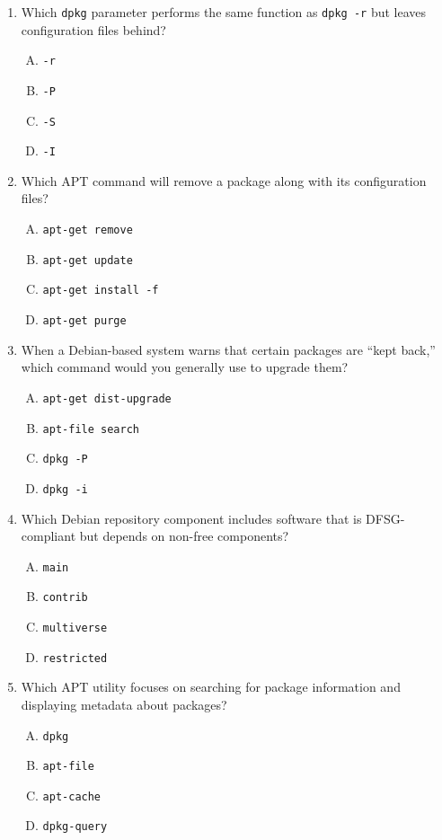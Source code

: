 \documentclass[a4paper]{report}
\begin{document}
\begin{enumerate}[1.]
    \item Which \texttt{dpkg} parameter performs the same function as \texttt{dpkg -r} but leaves configuration files behind?  
    \begin{enumerate}[A)]
        \item \texttt{-r}  
        \item \texttt{-P}  
        \item \texttt{-S}  
        \item \texttt{-I}  
    \end{enumerate}

    \item Which APT command will remove a package along with its configuration files?  
    \begin{enumerate}[A)]
        \item \texttt{apt-get remove}  
        \item \texttt{apt-get update}  
        \item \texttt{apt-get install -f}  
        \item \texttt{apt-get purge}  
    \end{enumerate}

    \item When a Debian-based system warns that certain packages are “kept back,” which command would you generally use to upgrade them?  
    \begin{enumerate}[A)]
        \item \texttt{apt-get dist-upgrade}  
        \item \texttt{apt-file search}  
        \item \texttt{dpkg -P}  
        \item \texttt{dpkg -i}  
    \end{enumerate}

    \item Which Debian repository component includes software that is DFSG-compliant but depends on non-free components?  
    \begin{enumerate}[A)]
        \item \texttt{main}  
        \item \texttt{contrib}  
        \item \texttt{multiverse}  
        \item \texttt{restricted}  
    \end{enumerate}

    \item Which APT utility focuses on searching for package information and displaying metadata about packages?  
    \begin{enumerate}[A)]
        \item \texttt{dpkg}  
        \item \texttt{apt-file}  
        \item \texttt{apt-cache}  
        \item \texttt{dpkg-query}  
    \end{enumerate}


\end{enumerate}
\end{document}
